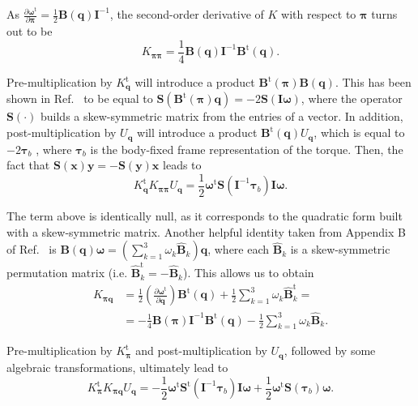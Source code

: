 \documentclass[
	aip,
	jcp,
	reprint,
]{revtex4-1}
\newcommand{\mt}[1]{\boldsymbol{\mathbf{#1}}}          %
\newcommand{\vt}[1]{\boldsymbol{\mathbf{#1}}}          %
\newcommand{\tr}[1]{#1^\text{t}}                       %
\newcommand{\diff}[2]{\frac{\partial #1}{\partial #2}} %
\begin{document}
As $\diff{\tr{\vt \omega}}{\vt \pi} = \frac{1}{2} {\mt B}(\vt q) {\mt I}^{-1}$, the second-order derivative of $K$ with respect to $\vt \pi$ turns out to be
\begin{equation*}
K_{\vt \pi \vt \pi} = \frac{1}{4} {\mt B}(\vt q) {\mt I}^{-1} \tr{\mt B}(\vt q).
\end{equation*}

Pre-multiplication by $\tr{K_{\vt q}}$ will introduce a product $\tr{\mt B}(\vt \pi) {\mt B}(\vt q)$.
This has been shown in Ref.~ to be equal to ${\mt S}\left( \tr{\mt B}(\vt \pi) {\vt q} \right) = -2 {\mt S}({\mt I} {\vt \omega})$, where the operator ${\mt S}(\cdot)$ builds a skew-symmetric matrix from the entries of a vector.
In addition, post-multiplication by $U_{\vt q}$ will introduce a product $\tr{\mt B}(\vt q) U_{\vt q}$, which is equal to $-2 {\vt \tau}_b$ \cite{Silveira_2017}, where ${\vt \tau}_b$ is the body-fixed frame representation of the torque.
Then, the fact that ${\mt S}(\vt x) {\vt y} = -{\mt S}(\vt y) {\vt x}$ leads to
\begin{equation*}
\tr{K_{\vt q}} K_{\vt \pi \vt \pi} U_{\vt q} = \frac{1}{2} \tr{\vt \omega} {\mt S}({\mt I}^{-1} {\vt \tau}_b) {\mt I} {\vt \omega}.
\end{equation*}

The term above is identically null, as it corresponds to the quadratic form built with a skew-symmetric matrix.
Another helpful identity taken from Appendix B of Ref.~ is ${\mt B}(\vt q){\vt \omega} = ( \sum_{k=1}^3 \omega_k \hat{\mt B}_k ) \vt q$, where each $\hat{\mt B}_k$ is a skew-symmetric permutation matrix (i.e. $\tr{\hat{\mt B}}_k = -\hat{\mt B}_k$).
This allows us to obtain
\begin{align*}
K_{\vt \pi \vt q} &= \frac{1}{2} \left(\diff{\tr{\vt \omega}}{\vt q}\right) \tr{\mt B}(\vt q) + \frac{1}{2} \sum_{k=1}^3 \omega_k \tr{\hat{\mt B}}_k = \\
&= -\frac{1}{4} {\mt B}(\vt \pi) {\mt I}^{-1} \tr{\mt B}(\vt q) - \frac{1}{2} \sum_{k=1}^3 \omega_k \hat{\mt B}_k.
\end{align*}

Pre-multiplication by $\tr{K_{\vt \pi}}$ and post-multiplication by $U_{\vt q}$, followed by some algebraic transformations, ultimately lead to
\begin{equation*}
\tr{K_{\vt \pi}} K_{\vt \pi \vt q} U_{\vt q} = -\frac{1}{2} \tr{\vt \omega} \tr{\mt S}({\mt I}^{-1} {\vt \tau}_b) {\mt I} {\vt \omega} + \frac{1}{2} \tr{\vt \omega} {\mt S}({\vt \tau}_b){\vt \omega}.
\end{equation*}
\end{document}
